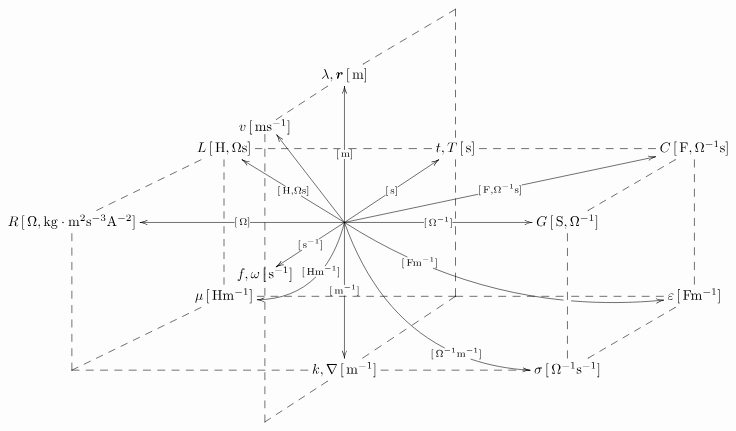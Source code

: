 \documentclass[a4j,10pt]{jarticle}
\makeatletter
\def\uni#1{[\unit{#1}]}
\def\cell#1#2{#1\,\uni{#2}}
\def\dotted#1{\ar@{--}[#1]}
\def\r{\bm r}
\makeatother
\begin{document}
\vspace{-10mm}
\def\tom{\ar[uu]|-{\uni{m}}}
\def\tos{\ar[ur]|-{\uni{s}}}
\def\toO{\ar[ll]|-{\uni{O}}}
\def\tomm{\ar[dd]|-{\uni{m^{-1}}}}
\def\toms{\ar@{->}+(-20,-13)*{\cell{f,\omega}{s^{-1}}}|-{\uni{s^{-1}}}}
\def\tomO{\ar[rr]|-{\uni{O^{-1}}}}
\def\arrr{\dotted{rr}}
\def\ardd{\dotted{dd}}
\def\arddsplit{\dotted{dd}|!{[ld];[rd]}\hole}
\def\aruu{\dotted{uu}}
\def\arll{\dotted{ll}}
\def\arllsplit{\dotted{ll}|!{[ld];[lu]}\hole}
\def\arrrsplit{\dotted{rr}|!{[rd];[ru]}\hole}
\def\ard{\dotted{d}}
\def\arur{\dotted{ur}}
\def\ardr{\dotted{dr}}
\def\ardl{\dotted{dl}}
\def\arrowzp{\ar@/^2pc/[dl]|-(0.4){\uni{Hm^{-1}}}}
\def\arrowzzp{\ar@/_2pc/[rrrd]|-(0.25){\uni{Fm^{-1}}}|!{[rr];[rrdd]}\hole }
\def\tolv{\ar@{--}'+(-20,-13)*{\cell{v}{ms^{-1}}}'[dd]+(-20,-13)}
\def\tov{\ar@{->}[uu]+(-20,-13)+(3,-2)}
\def\toL{\ar@{->}[ul]|-{\uni{H,Os}}}
\def\toC{\ar@{->}[urrr]|-{\uni{F,O^{-1}s}}}
\def\arrowyyp{\ar@/_3pc/@{->}[rrdd]|-(0.7){\uni{O^{-1}m^{-1}}}}
\def\tof{\ar@{--}'+(-20,-13)'[uu]+(-20,-13)}
\def\toT{\ar@{--}'[ur]'[dr]}
\[\xymatrix@=0.50in{
  &&*=0{}&*=0{}&*=0{}&\\
      &      & \cell{\lambda,\r}{m} \tolv \toT &      &      &      & \\
      &      \cell{L}{H,Os} \arrrsplit\arddsplit      &      & \cell{t,T}{s}\arrr\arddsplit      &      & \cell{C}{F,O^{-1}s} \ardd      &      \\
 \cell{R}{O,kg\cdot m^2 s^{-3} A^{-2}}\ardd\arur      &      & *=0{}\arrowyyp\toL\toC\tov\tom\tos\toO\tomO\tomm\toms \arrowzzp \arrowzp      &      & \cell{G}{S,\Omega^{-1}}\arur\ardd      &      & \\
      &      \cell{\mu}{Hm^{-1}}      &      & *=0{} \ardl\arll      &      & \cell{\varepsilon}{Fm^{-1}} \arllsplit      &      \\
 *=0{} \arur      &      & \cell{k,\nabla}{m^{-1}} \arll\tof      &      & \cell{\sigma}{O^{-1}s^{-1}}\arll\arur      &      & \\
 }\]
\end{document}
